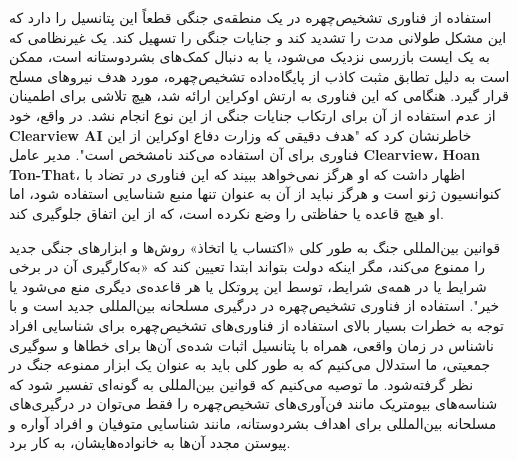استفاده از فناوری تشخیص‌چهره در یک منطقه‌ی جنگی قطعاً این پتانسیل را دارد که این مشکل طولانی مدت را تشدید کند و جنایات جنگی را تسهیل کند.
یک غیرنظامی که به یک ایست بازرسی نزدیک می‌شود، یا به دنبال کمک‌های بشردوستانه است، ممکن است به دلیل تطابق مثبت کاذب از پایگاه‌داده تشخیص‌چهره، مورد هدف نیروهای مسلح قرار گیرد.
هنگامی که این فناوری به ارتش اوکراین ارائه شد، هیچ تلاشی برای اطمینان از عدم استفاده از آن برای ارتکاب جنایات جنگی از این نوع انجام نشد.
در واقع، خود \textenglish{\textbf{Clearview AI}} خاطرنشان کرد که "هدف دقیقی که وزارت دفاع اوکراین از این فناوری برای آن استفاده می‌کند نامشخص است".
مدیر عامل \textenglish{\textbf{Clearview}}، \textenglish{\textbf{Hoan Ton-That}}، اظهار داشت که او هرگز نمی‌خواهد ببیند که این فناوری در تضاد با کنوانسیون ژنو است و هرگز نباید از آن به عنوان تنها منبع شناسایی استفاده شود، اما او هیچ قاعده یا حفاظتی را وضع نکرده است، که از این اتفاق جلوگیری کند.

قوانین بین‌المللی جنگ به طور کلی «اکتساب یا اتخاذ» روش‌ها و ابزارهای جنگی جدید را ممنوع می‌کند، مگر اینکه دولت بتواند ابتدا تعیین کند که «به‌کارگیری آن در برخی شرایط یا در همه‌ی شرایط، توسط این پروتکل یا هر قاعده‌ی دیگری منع می‌شود یا خیر".
استفاده از فناوری تشخیص‌چهره در درگیری مسلحانه بین‌المللی جدید است و با توجه به خطرات بسیار بالای استفاده از فناوری‌های تشخیص‌چهره برای شناسایی افراد ناشناس در زمان واقعی، همراه با پتانسیل اثبات شده‌ی آن‌ها برای خطاها و سوگیری جمعیتی، ما استدلال می‌کنیم که به طور کلی باید به عنوان یک ابزار ممنوعه جنگ در نظر گرفته‌شود.
ما توصیه می‌کنیم که قوانین بین‌المللی به گونه‌ای تفسیر شود که شناسه‌های بیومتریک مانند فن‌آوری‌های تشخیص‌چهره را فقط می‌توان در درگیری‌های مسلحانه بین‌المللی برای اهداف بشردوستانه، مانند شناسایی متوفیان و افراد آواره و پیوستن مجدد آن‌ها به خانواده‌هایشان، به کار برد.



